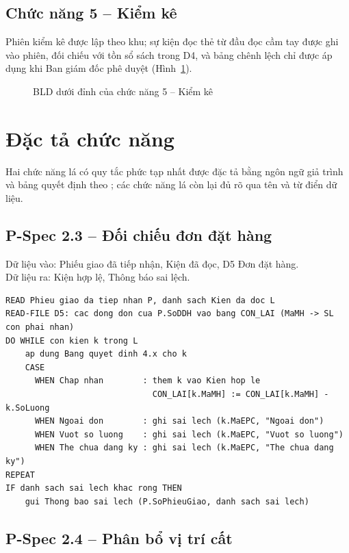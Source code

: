 \subsection{Chức năng 5 -- Kiểm kê}

Phiên kiểm kê được lập theo khu; sự kiện đọc thẻ từ đầu đọc cầm tay được ghi vào phiên, đối chiếu với tồn sổ sách trong D4, và bảng chênh lệch chỉ được áp dụng khi Ban giám đốc phê duyệt (Hình~\ref{fig:bldkiemke}).

\begin{figure}[H]
\centering
{}
\caption{BLD dưới đỉnh của chức năng 5 -- Kiểm kê}
\label{fig:bldkiemke}
\end{figure}

\section{Đặc tả chức năng}
\label{sec:pspec}

Hai chức năng lá có quy tắc phức tạp nhất được đặc tả bằng ngôn ngữ giả trình và bảng quyết định theo \cite[Ch.~2]{tung_qlhttt}; các chức năng lá còn lại đủ rõ qua tên và từ điển dữ liệu.

\subsection{P-Spec 2.3 -- Đối chiếu đơn đặt hàng}

\noindent Dữ liệu vào: Phiếu giao đã tiếp nhận, Kiện đã đọc, D5 Đơn đặt hàng.\\
Dữ liệu ra: Kiện hợp lệ, Thông báo sai lệch.

\begin{lstlisting}[language=gia-trinh]
READ Phieu giao da tiep nhan P, danh sach Kien da doc L
READ-FILE D5: cac dong don cua P.SoDDH vao bang CON_LAI (MaMH -> SL con phai nhan)
DO WHILE con kien k trong L
    ap dung Bang quyet dinh 4.x cho k
    CASE
      WHEN Chap nhan        : them k vao Kien hop le
                              CON_LAI[k.MaMH] := CON_LAI[k.MaMH] - k.SoLuong
      WHEN Ngoai don        : ghi sai lech (k.MaEPC, "Ngoai don")
      WHEN Vuot so luong    : ghi sai lech (k.MaEPC, "Vuot so luong")
      WHEN The chua dang ky : ghi sai lech (k.MaEPC, "The chua dang ky")
REPEAT
IF danh sach sai lech khac rong THEN
    gui Thong bao sai lech (P.SoPhieuGiao, danh sach sai lech)
\end{lstlisting}

\subsection{P-Spec 2.4 -- Phân bổ vị trí cất}

